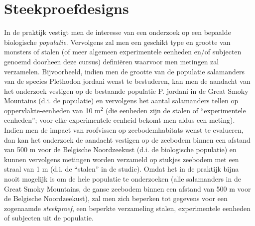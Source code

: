 \documentclass[
  12pt,dutch,coursenotes]{book}
\theoremstyle{definition}
\theoremstyle{definition}
\theoremstyle{definition}
\theoremstyle{remark}
\begin{document}
\hypertarget{sec:steekproefdesigns}{%
\section{Steekproefdesigns}\label{sec:steekproefdesigns}}

In de praktijk vestigt men de interesse van een onderzoek op een bepaalde biologische \emph{populatie}. Vervolgens zal men een geschikt type en grootte van monsters of stalen (of meer algemeen experimentele eenheden en/of subjecten genoemd doorheen deze cursus) definiëren waarvoor men metingen zal verzamelen. Bijvoorbeeld, indien men de grootte van de populatie salamanders van de species Plethodon jordani wenst te bestuderen, kan men de aandacht van het onderzoek vestigen op de bestaande populatie P. jordani in de Great Smoky Mountains (d.i. de populatie) en vervolgens het aantal salamanders tellen op oppervlakte-eenheden van 10 m\(^2\) (die eenheden zijn de stalen of ``experimentele eenheden''; voor elke experimentele eenheid bekomt men aldus een meting). Indien men de impact van roofvissen op zeebodemhabitats wenst te evalueren, dan kan het onderzoek de aandacht vestigen op de zeebodem binnen een afstand van 500 m voor de Belgische Noordzeekust (d.i. de biologische populatie) en kunnen vervolgens metingen worden verzameld op stukjes zeebodem met een straal van 1 m (d.i. de ``stalen'' in de studie). Omdat het in de praktijk bijna nooit mogelijk is om de hele populatie te onderzoeken (alle salamanders in de Great Smoky Mountains, de ganse zeebodem binnen een afstand van 500 m voor de Belgische Noordzeekust), zal men zich beperken tot gegevens voor een zogenaamde \emph{steekproef}, een beperkte verzameling stalen, experimentele eenheden of subjecten uit de populatie.
\end{document}
